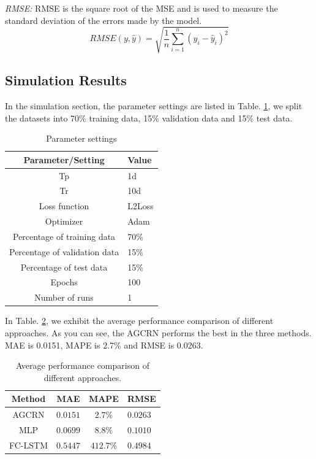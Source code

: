 \documentclass[sigconf, authordraft]{acmart}
\begin{document}
\emph{RMSE:} RMSE is the square root of the MSE and is used to measure the standard
deviation of the errors made by the model.
\[
	RMSE(y, \hat{y}) = \sqrt{\frac{1}{n}\sum_{i=1}^{n}(y_{i}- \hat{y}_{i})^{2}}
\]
\subsection{Simulation Results}
In the simulation section, the parameter settings are listed in Table.
\ref{Parameter settings }, we split the datasets into 70\% training data, 15\%
validation data and 15\% test data.

\begin{table}
	\caption{Parameter settings }
	\label{Parameter settings }
	\begin{tabular}{cl}
		\toprule Parameter/Setting    & Value  \\
		\midrule Tp                   & 1d     \\
		Tr                            & 10d    \\
		Loss function                 & L2Loss \\
		Optimizer                     & Adam   \\
		Percentage of training data   & 70\%   \\
		Percentage of validation data & 15\%   \\
		Percentage of test data       & 15\%   \\
		Epochs                        & 100    \\
		Number of runs                & 1      \\
		\bottomrule
	\end{tabular}
\end{table}

In Table. \ref{Average performance}, we exhibit the average performance
comparison of different approaches. As you can see, the AGCRN performs the
best in the three methods. MAE is 0.0151, MAPE is 2.7\% and RMSE is 0.0263.

\begin{table}
	\caption{Average performance comparison of different approaches.}
	\label{Average performance}
	\begin{tabular}{cccl}
		\toprule Method & MAE      & MAPE      & RMSE     \\
		\midrule AGCRN  & $0.0151$ & $2.7\%$   & $0.0263$ \\
		MLP             & $0.0699$ & $8.8\%$   & $0.1010$ \\
		FC-LSTM         & $0.5447$ & $412.7\%$ & $0.4984$ \\
		\bottomrule
	\end{tabular}
\end{table}
\end{document}
